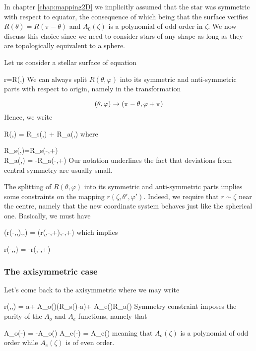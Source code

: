 In chapter \ref{chap:mapping2D} we implicitly assumed that the star was
symmetric with respect to equator, the consequence of which  being that
the surface verifies $R(\theta)=R(\pi-\theta)$ and $A_0(\zeta)$ is a
polynomial of odd order in $\zeta$. We now discuss this choice since we
need to consider stars of any shape as long as they are topologically
equivalent to a sphere.

Let us consider a stellar surface of equation

\beq r=R(\theta,\varphi)\eeq
We can always split $R(\theta,\varphi)$ into its symmetric and
anti-symmetric parts with respect to origin, namely in the
transformation

\[ (\theta,\varphi) \rightarrow (\pi-\theta,\varphi+\pi)\]
Hence, we write

\beq R(\theta,\varphi) = R_s(\theta,\varphi) + \delta R_a(\theta,\varphi)
\eeq
where

\greq
R_s(\theta,\varphi)=R_s(\pi-\theta,\varphi+\pi) \\
\delta R_a(\theta,\varphi) = -\delta R_a(\pi-\theta,\varphi+\pi)
\egreq
Our notation underlines the fact that deviations from central symmetry
are usually small.

The splitting of $R(\theta,\varphi)$ into its symmetric and
anti-symmetric parts implies some constraints on the mapping
$r(\zeta,\theta',\varphi')$. Indeed, we require that $r\sim\zeta$ near
the centre, namely that the new coordinate system behaves just like the
spherical one. Basically, we must have

\beq \vr(r(-\zeta,\theta,\varphi),\theta,\varphi) =
\vr(r(\zeta,\pi-\theta,\varphi+\pi),\pi-\theta,\varphi+\pi) \eeq
which implies

\beq r(-\zeta,\theta,\varphi) = -r(\zeta,\pi-\theta,\varphi+\pi) 

\subsubsection{The axisymmetric case}

Let's come back to the axisymmetric where we may write

\beq r(\zeta,\theta,\varphi) = a\zeta + A_o(\zeta)(R_s(\theta)-a)+
A_e(\zeta)\delta R_a(\theta)\leq\zeta{} 
Symmetry constraint  imposes the parity of the $A_o$ and $A_e$
functions, namely that

\beq A_o(-\zeta) = -A_o(\zeta) \andet A_e(-\zeta) = A_e(\zeta) \eeq
meaning that $A_o(\zeta)$ is a polynomial of odd order while $A_e(\zeta)$
is of even order.

